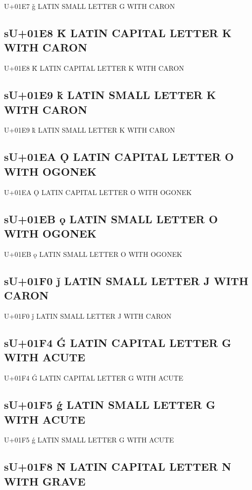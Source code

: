 U+01E7 ǧ  LATIN SMALL LETTER G WITH CARON

\subsection{sU+01E8 Ǩ  LATIN CAPITAL LETTER K WITH CARON}

U+01E8 Ǩ  LATIN CAPITAL LETTER K WITH CARON

\subsection{sU+01E9 ǩ  LATIN SMALL LETTER K WITH CARON}

U+01E9 ǩ  LATIN SMALL LETTER K WITH CARON

\subsection{sU+01EA Ǫ  LATIN CAPITAL LETTER O WITH OGONEK}

U+01EA Ǫ  LATIN CAPITAL LETTER O WITH OGONEK

\subsection{sU+01EB ǫ  LATIN SMALL LETTER O WITH OGONEK}

U+01EB ǫ  LATIN SMALL LETTER O WITH OGONEK

\subsection{sU+01F0 ǰ  LATIN SMALL LETTER J WITH CARON}

U+01F0 ǰ  LATIN SMALL LETTER J WITH CARON

\subsection{sU+01F4 Ǵ  LATIN CAPITAL LETTER G WITH ACUTE}

U+01F4 Ǵ  LATIN CAPITAL LETTER G WITH ACUTE

\subsection{sU+01F5 ǵ  LATIN SMALL LETTER G WITH ACUTE}

U+01F5 ǵ  LATIN SMALL LETTER G WITH ACUTE

\subsection{sU+01F8 Ǹ LATIN CAPITAL LETTER N WITH GRAVE}


